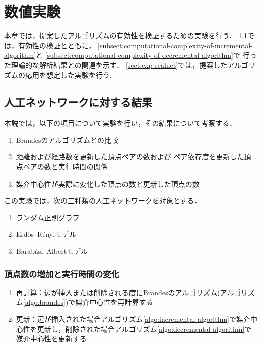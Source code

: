 \chapter{数値実験}
\label{chap:experiment}

本章では，提案したアルゴリズムの有効性を検証するための実験を行う．
\ref{sect:exp-artificial}では，有効性の検証とともに，
\ref{subsect:computational-complexity-of-incremental-algorithm}と
\ref{subsect:computational-complexity-of-decremental-algorithm}で
行った理論的な解析結果との関連を示す．
\ref{sect:exp-realnet}では，提案したアルゴリズムの応用を想定した実験を行う．

\section{人工ネットワークに対する結果}
\label{sect:exp-artificial}

本説では，以下の項目について実験を行い，その結果について考察する．
\begin{enumerate}
\item Brandesのアルゴリズムとの比較
\item 距離および経路数を更新した頂点ペアの数および
  ペア依存度を更新した頂点ペアの数と実行時間の関係
\item 媒介中心性が実際に変化した頂点の数と更新した頂点の数
\end{enumerate}

この実験では，次の三種類の人工ネットワークを対象とする．
\begin{enumerate}
\item ランダム正則グラフ
\item Erd\H{o}s--R\'{e}nyiモデル\cite{Erdos1959}
\item Barab\'{a}si--Albertモデル\cite{Barabasi1999}
\end{enumerate}

\subsection{頂点数の増加と実行時間の変化}

\begin{enumerate}
\item 再計算：辺が挿入または削除される度にBrandesのアルゴリズム(アルゴリズム\ref{algo:brandes})で媒介中心性を再計算する
\item 更新：辺が挿入された場合アルゴリズム\ref{algo:incremental-algorithm}で媒介中心性を更新し，削除された場合アルゴリズム\ref{algo:decremental-algorithm}で媒介中心性を更新する
\end{enumerate}

